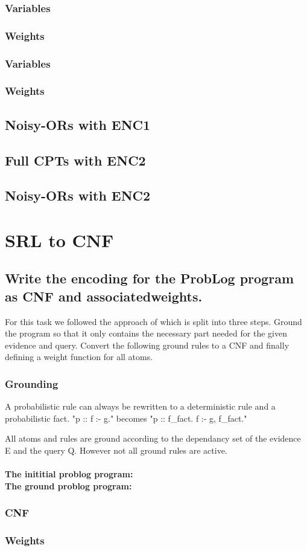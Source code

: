 \documentclass{article}
\begin{document}
\subsubsection{Variables}

\subsubsection{Weights}

\subsubsection{Variables}
\subsubsection{Weights}
\subsection{Noisy-ORs with ENC1}
\subsection{Full CPTs with ENC2}
\subsection{Noisy-ORs with ENC2}
\section{SRL to CNF}
\subsection{Write the encoding for the ProbLog program as CNF and associatedweights.}
For this task we followed the approach of \cite{Fierens} which is split into three steps. Ground the program so that it only contains the necessary part needed for the given evidence and query. Convert the following ground rules to a CNF and finally defining a weight function for all atoms.

\subsubsection{Grounding}
A probabilistic rule can always be rewritten to a deterministic rule and a probabilistic fact. "p :: f :- g." becomes "p :: f\_fact. f :- g, f\_fact."

All atoms and rules are ground according to the dependancy set of the evidence E and the query Q. However not all ground rules are active.
\\\\
\textbf{The inititial problog program:}
\\

\textbf{The ground problog program:}
\\


\subsubsection{CNF}
\subsubsection{Weights}




\end{document}
